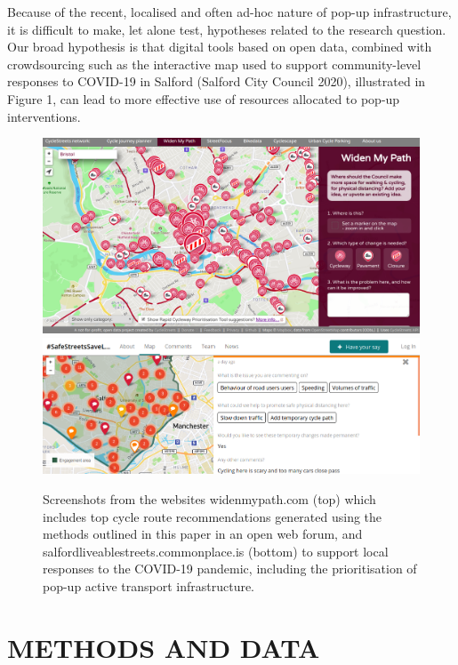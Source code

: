 \documentclass[
]{article}
\begin{document}
Because of the recent, localised and often ad-hoc nature of pop-up infrastructure, it is difficult to make, let alone test, hypotheses related to the research question.
Our broad hypothesis is that digital tools based on open data, combined with crowdsourcing such as the interactive map used to support community-level responses to COVID-19 in Salford (Salford City Council 2020), illustrated in Figure 1, can lead to more effective use of resources allocated to pop-up interventions.

\begin{figure}
\includegraphics[width=1\linewidth]{figures/widenmypath} \includegraphics[width=1\linewidth]{figures/saferstreets} \caption{Screenshots from the websites widenmypath.com (top) which includes top cycle route recommendations generated using the methods outlined in this paper in an open web forum, and salfordliveablestreets.commonplace.is (bottom) to support local responses to the COVID-19 pandemic, including the prioritisation of pop-up active transport infrastructure.}\label{fig:commonplace}
\end{figure}

\hypertarget{methods-and-data}{%
\section{METHODS AND DATA}\label{methods-and-data}}
\end{document}
